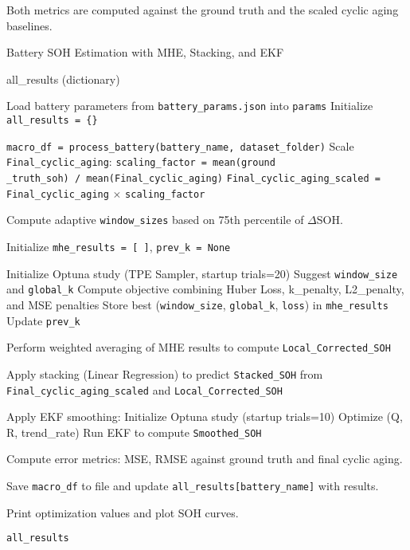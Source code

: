 Both metrics are computed against the ground truth and the scaled cyclic aging baselines.


\begin{algorithm}
\caption{Battery SOH Estimation with MHE, Stacking, and EKF}
\label{alg:algorithm}
\begin{algorithmic}[1]
\ENSURE all\_results (dictionary)

\STATE Load battery parameters from \texttt{battery\_params.json} into \texttt{params}
\STATE Initialize \texttt{all\_results = \{\}}

    \STATE \texttt{macro\_df = process\_battery(battery\_name, dataset\_folder)}
    \STATE Scale \texttt{Final\_cyclic\_aging}:
    \STATE \hspace{0.5cm} \texttt{scaling\_factor = mean(ground\\\_truth\_soh) / mean(Final\_cyclic\_aging)}
    \STATE \hspace{0.5cm} \texttt{Final\_cyclic\_aging\_scaled = Final\_cyclic\_aging} $\times$ \texttt{scaling\_factor}

    \STATE Compute adaptive \texttt{window\_sizes} based on 75th percentile of $\Delta$SOH.

    \STATE Initialize \texttt{mhe\_results = [ ]}, \texttt{prev\_k = None}

        \STATE Initialize Optuna study (TPE Sampler, startup trials=20)
            \STATE Suggest \texttt{window\_size} and \texttt{global\_k}
            \STATE Compute objective combining Huber Loss, k\_penalty, L2\_penalty, and MSE penalties
        \ENDFOR
        \STATE Store best (\texttt{window\_size}, \texttt{global\_k}, \texttt{loss}) in \texttt{mhe\_results}
        \STATE Update \texttt{prev\_k}
    \ENDFOR

    \STATE Perform weighted averaging of MHE results to compute \texttt{Local\_Corrected\_SOH}

    \STATE Apply stacking (Linear Regression) to predict \texttt{Stacked\_SOH} from \texttt{Final\_cyclic\_aging\_scaled} and \texttt{Local\_Corrected\_SOH}

    \STATE Apply EKF smoothing:
    \STATE \hspace{0.5cm} Initialize Optuna study (startup trials=10)
    \STATE \hspace{0.5cm} Optimize (Q, R, trend\_rate)
    \STATE \hspace{0.5cm} Run EKF to compute \texttt{Smoothed\_SOH}

    \STATE Compute error metrics: MSE, RMSE against ground truth and final cyclic aging.

    \STATE Save \texttt{macro\_df} to file and update \texttt{all\_results[battery\_name]} with results.

    \STATE Print optimization values and plot SOH curves.
\ENDFOR

\RETURN \texttt{all\_results}

\end{algorithmic}
\end{algorithm}

